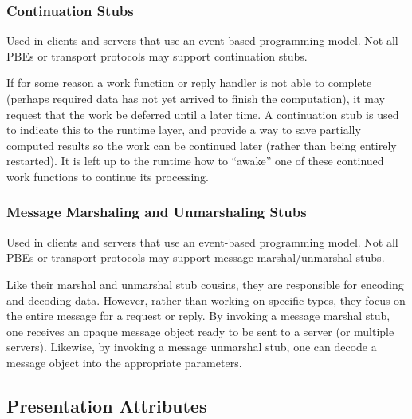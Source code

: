 

\subsubsection{Continuation Stubs}

Used in clients and servers that use an event-based programming model.  Not all
PBEs or transport protocols may support continuation stubs.

If for some reason a work function or reply handler is not able to complete
(perhaps required data has not yet arrived to finish the computation), it may
request that the work be deferred until a later time.  A continuation stub is
used to indicate this to the runtime layer, and provide a way to save partially
computed results so the work can be continued later (rather than being entirely
restarted).  It is left up to the runtime how to ``awake'' one of these
continued work functions to continue its processing.



\subsubsection{Message Marshaling and Unmarshaling Stubs}

Used in clients and servers that use an event-based programming model.  Not all
PBEs or transport protocols may support message marshal/unmarshal stubs.

Like their marshal and unmarshal stub cousins, they are responsible for
encoding and decoding data.  However, rather than working on specific types,
they focus on the entire message for a request or reply.  By invoking a message
marshal stub, one receives an opaque message object ready to be sent to a
server (or multiple servers).  Likewise, by invoking a message unmarshal stub,
one can decode a message object into the appropriate parameters.



\subsection{Presentation Attributes}
\label{subsec:PRESC:Presentation Attributes}

